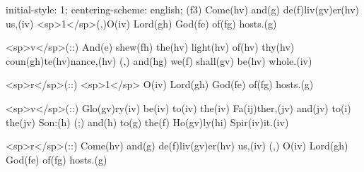 initial-style: 1;
centering-scheme: english;
(f3) Come(hv) and(g) de(f)liv(gv)er(hv) us,(iv) <sp>1</sp>(,)O(iv) Lord(gh) God(fe) of(fg) hosts.(g) 

<sp>v</sp>(::) And(e) shew(fh) the(hv) light(hv) of(hv) thy(hv) coun(gh)te(hv)nance,(hv) (,) and(hg) we(f) shall(gv) be(hv) whole.(iv) 

<sp>r</sp>(::) <sp>1</sp> O(iv) Lord(gh) God(fe) of(fg) hosts.(g)

<sp>v</sp>(::) Glo(gv)ry(iv) be(iv) to(iv) the(iv) Fa(ij)ther,(jv) and(jv) to(i) the(jv) Son:(h) (;) and(h) to(g) the(f) Ho(gv)ly(hi) Spir(iv)it.(iv)

<sp>r</sp>(::) Come(hv) and(g) de(f)liv(gv)er(hv) us,(iv) (,) O(iv) Lord(gh) God(fe) of(fg) hosts.(g) 